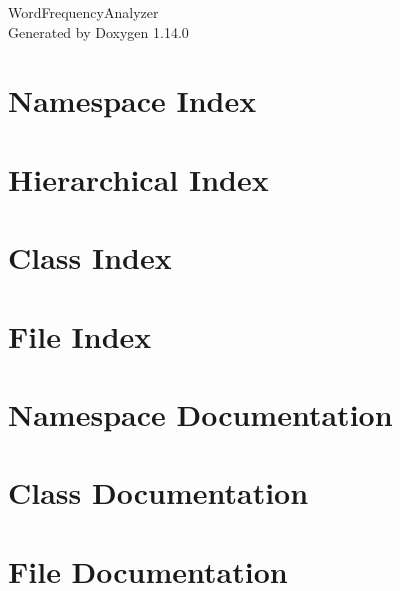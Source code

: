 \documentclass[twoside]{book}
\newcommand{\+}{\discretionary{\mbox{\scriptsize$\hookleftarrow$}}{}{}}
\newcommand{\clearemptydoublepage}{%
    \newpage{\pagestyle{empty}\cleardoublepage}%
  }
\begin{document}
  \raggedbottom
    \hypersetup{pageanchor=false,
                bookmarksnumbered=true,
                pdfencoding=unicode
               }
  \begin{titlepage}
  \vspace*{7cm}
  \begin{center}%
  {\Large Word\+Frequency\+Analyzer}\\
  \vspace*{1cm}
  {\large Generated by Doxygen 1.14.0}\\
  \end{center}
  \end{titlepage}
  \clearemptydoublepage
  \tableofcontents
  \clearemptydoublepage
  \hypersetup{pageanchor=true}
\chapter{Namespace Index}

\chapter{Hierarchical Index}

\chapter{Class Index}

\chapter{File Index}

\chapter{Namespace Documentation}


\chapter{Class Documentation}



\chapter{File Documentation}






  \backmatter
  \newpage
  \clearemptydoublepage
  \printindex
\end{document}
